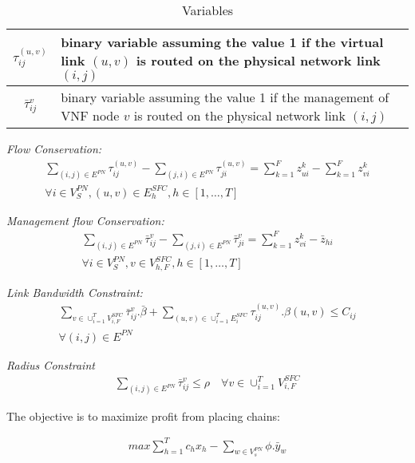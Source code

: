 \begin{table}[H]
    \label{tbl:variables-2}
    \caption{Variables}
    \begin{center}\begin{tabular}{|c|p{}|}
    \hline
    \(\tau^{(u,v)}_{ij}\) & binary variable assuming the value 1 if the virtual link \((u,v)\) is routed on the physical network link \((i,j)\) \\
    \hline
    \(\bar{\tau}^{v}_{ij}\) & binary variable assuming the value 1 if the management of VNF node \(v\) is routed on the physical network link \((i,j)\) \\
    \hline
    \end{tabular}\end{center}
\end{table}

\textit{Flow Conservation:}
\begin{align}
    \sum_{(i,j) \in E^{PN}} \tau_{ij}^{(u,v)} - \sum_{(j,i) \in E^{PN}} \tau_{ji}^{(u,v)} = \sum_{k=1}^{F} z_{ui}^{k} - \sum_{k=1}^{F} z_{vi}^{k} \nonumber \\
    \forall i \in V_{S}^{PN}, (u,v) \in E_{h}^{SFC}, h \in [1,\ldots, T]
\end{align}

\textit{Management flow Conservation:}
\begin{align}
    \sum_{(i,j) \in E^{PN}} \bar{\tau}_{ij}^{v} - \sum_{(j,i) \in E^{PN}} \bar{\tau}_{ji}^{v} = \sum_{k=1}^{F} z_{vi}^{k} - \bar{z}_{hi} \nonumber \\
    \forall i \in V_{S}^{PN}, v \in V_{h, F}^{SFC}, h \in [1,\ldots, T]
\end{align}

\textit{Link Bandwidth Constraint:}
\begin{align}
    \sum_{v \in \cup_{i=1}^{T} V_{i,F}^{SFC}} \bar{\tau}_{ij}^{v} . \bar{\beta} + \sum_{(u,v) \in \cup_{i=1}^{T} E_{i}^{SFC}} \tau_{ij}^{(u,v)} . \beta(u,v) \le C_{ij} \nonumber \\
    \forall (i, j) \in E^{PN}
\end{align}

\textit{Radius Constraint}
\begin{align}
    \sum_{(i, j) \in E^{PN}} \bar{\tau}_{ij}^{v} \le \rho
    \quad
    \forall v \in \cup_{i=1}^T V_{i, F}^{SFC}
\end{align}

The objective is to maximize profit from placing chains:

\begin{align}
    max \sum_{h=1}^{T} c_hx_h - \sum_{w \in V_s^{PN}} \phi . \bar{y}_w
\end{align}